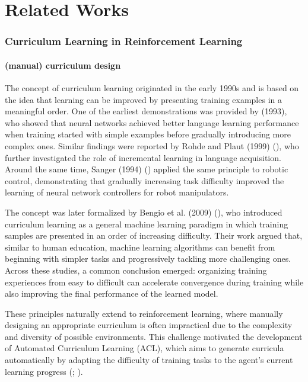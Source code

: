 \chapter{Related Works}\label{sec:relatedWorks}

\subsection{Curriculum Learning in Reinforcement Learning}

\subsubsection{ (manual) curriculum design}
The concept of curriculum learning originated in the early 1990s and is based on the idea that learning can be improved by presenting training examples in a meaningful order. One of the earliest demonstrations was provided by \cite{elman1993learning} (1993), who showed that neural networks achieved better language learning performance when training started with simple examples before gradually introducing more complex ones. Similar findings were reported by Rohde and Plaut (1999) (\cite{rohde1999language}), who further investigated the role of incremental learning in language acquisition. Around the same time, Sanger (1994) (\cite{sanger1994neural}) applied the same principle to robotic control, demonstrating that gradually increasing task difficulty improved the learning of neural network controllers for robot manipulators.

The concept was later formalized by Bengio et al. (2009) (\cite{bengio2009curriculum}), who introduced curriculum learning as a general machine learning paradigm in which training samples are presented in an order of increasing difficulty. Their work argued that, similar to human education, machine learning algorithms can benefit from beginning with simpler tasks and progressively tackling more challenging ones. Across these studies, a common conclusion emerged: organizing training experiences from easy to difficult can accelerate convergence during training while also improving the final performance of the learned model.

These principles naturally extend to reinforcement learning, where manually designing an appropriate curriculum is often impractical due to the complexity and diversity of possible environments. This challenge motivated the development of Automated Curriculum Learning (ACL), which aims to generate curricula automatically by adapting the difficulty of training tasks to the agent's current learning progress (\cite{Portelas2020ACL}; \cite{Narvekar2020CurriculumLearning}).

